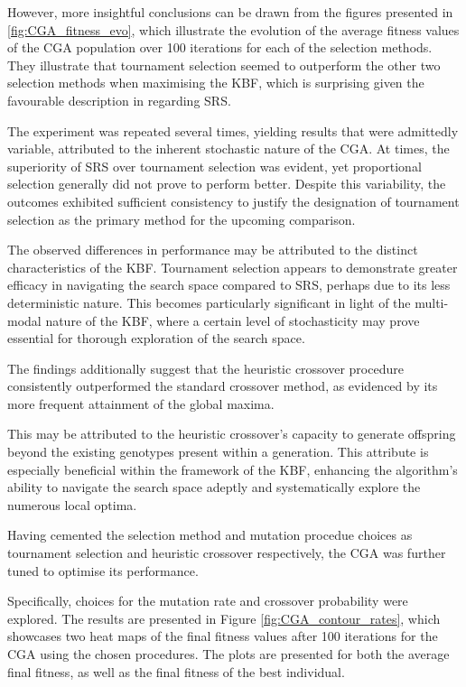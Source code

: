 \documentclass[10pt]{article}
\begin{document}
\begin{multicols}{2}
However, more insightful conclusions can be drawn from the figures presented in \ref{fig:CGA_fitness_evo}, which illustrate the evolution of the average fitness values of the CGA population over 100 iterations for each of the selection methods. They illustrate that tournament selection seemed to outperform the other two selection methods when maximising the KBF, which is surprising given the favourable description in \cite{parks2023geneticalgorithms} regarding SRS. 

The experiment was repeated several times, yielding results that were admittedly variable, attributed to the inherent stochastic nature of the CGA. At times, the superiority of SRS over tournament selection was evident, yet proportional selection generally did not prove to perform better. Despite this variability, the outcomes exhibited sufficient consistency to justify the designation of tournament selection as the primary method for the upcoming comparison.

The observed differences in performance may be attributed to the distinct characteristics of the KBF. Tournament selection appears to demonstrate greater efficacy in navigating the search space compared to SRS, perhaps due to its less deterministic nature. This becomes particularly significant in light of the multi-modal nature of the KBF, where a certain level of stochasticity may prove essential for thorough exploration of the search space.

The findings additionally suggest that the heuristic crossover procedure consistently outperformed the standard crossover method, as evidenced by its more frequent attainment of the global maxima. 

This may be attributed to the heuristic crossover's capacity to generate offspring beyond the existing genotypes present within a generation. This attribute is especially beneficial within the framework of the KBF, enhancing the algorithm's ability to navigate the search space adeptly and systematically explore the numerous local optima.

Having cemented the selection method and mutation procedue choices as tournament selection and heuristic crossover respectively, the CGA was further tuned to optimise its performance. 

Specifically, choices for the mutation rate and crossover probability were explored. The results are presented in Figure \ref{fig:CGA_contour_rates}, which showcases two heat maps of the final fitness values after 100 iterations for the CGA using the chosen procedures. The plots are presented for both the average final fitness, as well as the final fitness of the best individual.


\end{multicols}
\end{document}
